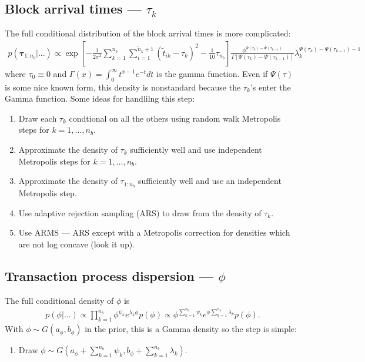 \documentclass{article}
\begin{document}
\subsection{Block arrival times --- $\tau_k$}
The full conditional distribution of the block arrival times is more complicated:
\begin{align*}
p(\bm{\tau}_{1:n_{b}}|...) \propto \exp\left[-\frac{1}{2\sigma^2}\sum_{k=1}^{n_{b}}\sum_{i=1}^{\tilde{n}_k+1}\left(\tilde{t}_{ik} - \tau_k\right)^2 - \frac{1}{10}\tau_{n_{b}}\right]\frac{\phi^{\Psi(\tau_k) - \Psi(\tau_{k-1})}}{\Gamma\left[\Psi(\tau_k) - \Psi(\tau_{k-1})\right]}\lambda_k^{\Psi(\tau_k)-\Psi(\tau_{k-1}) - 1}
\end{align*}
where $\tau_0\equiv0$ and $\Gamma(x) = \int_0^\infty t^{x-1}e^{-t}dt$ is the gamma function. Even if $\Psi(\tau)$ is some nice known form, this density is nonstandard because the $\tau_k$'s enter the Gamma function. Some ideas for handlilng this step:
\begin{enumerate}
\item Draw each $\tau_k$ condtional on all the others using random walk Metropolis steps for $k=1,\dots,n_{b}$.
\item Approximate the density of $\tau_k$ sufficiently well and use independent Metropolis steps for $k=1,\dots,n_{b}$.
\item Approximate the density of $\tau_{1:n_{b}}$ sufficiently well and use an independent Metropolis step.
\item Use adaptive rejection sampling (ARS) to draw from the density of $\tau_k$.
\item Use ARMS --- ARS except with a Metropolis correction for densities which are not log concave (look it up).
\end{enumerate}

\subsection{Transaction process dispersion --- $\phi$}
The full conditional density of $\phi$ is
\begin{align*}
p(\phi|...) \propto \prod_{k=1}^{n_{b}}\phi^{\psi_k}e^{\lambda_k\phi}p(\phi) \propto \phi^{\sum_{k=1}^{n_{b}}\psi_k}e^{\phi\sum_{k=1}^{n_{b}}\lambda_k}p(\phi).
\end{align*}
With $\phi \sim G(a_\phi, b_\phi)$ in the prior, this is a Gamma density so the step is simple:
\begin{enumerate}
\item Draw $\phi \sim G\left(a_\phi + \sum_{k=1}^{n_{b}}\psi_k, b_{\phi} + \sum_{k=1}^{n_{b}}\lambda_k \right)$.
\end{enumerate}
\end{document}
